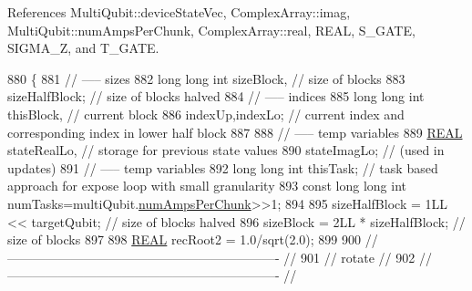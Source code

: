 References Multi\+Qubit\+::device\+State\+Vec, Complex\+Array\+::imag, Multi\+Qubit\+::num\+Amps\+Per\+Chunk, Complex\+Array\+::real, R\+E\+AL, S\+\_\+\+G\+A\+TE, S\+I\+G\+M\+A\+\_\+Z, and T\+\_\+\+G\+A\+TE.


\begin{DoxyCode}
880                                                                                                       \{
881     \textcolor{comment}{// ----- sizes}
882     \textcolor{keywordtype}{long} \textcolor{keywordtype}{long} \textcolor{keywordtype}{int} sizeBlock,                                           \textcolor{comment}{// size of blocks}
883          sizeHalfBlock;                                       \textcolor{comment}{// size of blocks halved}
884     \textcolor{comment}{// ----- indices}
885     \textcolor{keywordtype}{long} \textcolor{keywordtype}{long} \textcolor{keywordtype}{int} thisBlock,                                           \textcolor{comment}{// current block}
886          indexUp,indexLo;                                     \textcolor{comment}{// current index and corresponding index in
       lower half block}
887 
888     \textcolor{comment}{// ----- temp variables}
889     \mbox{\hyperlink{QuEST__precision_8h_a4b654506f18b8bfd61ad2a29a7e38c25}{REAL}}   stateRealLo,                             \textcolor{comment}{// storage for previous state values}
890            stateImagLo;                             \textcolor{comment}{// (used in updates)}
891     \textcolor{comment}{// ----- temp variables}
892     \textcolor{keywordtype}{long} \textcolor{keywordtype}{long} \textcolor{keywordtype}{int} thisTask;                                   \textcolor{comment}{// task based approach for expose loop with
       small granularity}
893     \textcolor{keyword}{const} \textcolor{keywordtype}{long} \textcolor{keywordtype}{long} \textcolor{keywordtype}{int} numTasks=multiQubit.\mbox{\hyperlink{structMultiQubit_a1cad83601a78635dd278259c7ed54f18}{numAmpsPerChunk}}>>1;
894 
895     sizeHalfBlock = 1LL << targetQubit;                               \textcolor{comment}{// size of blocks halved}
896     sizeBlock     = 2LL * sizeHalfBlock;                           \textcolor{comment}{// size of blocks}
897 
898     \mbox{\hyperlink{QuEST__precision_8h_a4b654506f18b8bfd61ad2a29a7e38c25}{REAL}} recRoot2 = 1.0/sqrt(2.0);
899 
900     \textcolor{comment}{// ---------------------------------------------------------------- //}
901     \textcolor{comment}{//            rotate                                                //}
902     \textcolor{comment}{// ---------------------------------------------------------------- //}

\end{DoxyCode}
